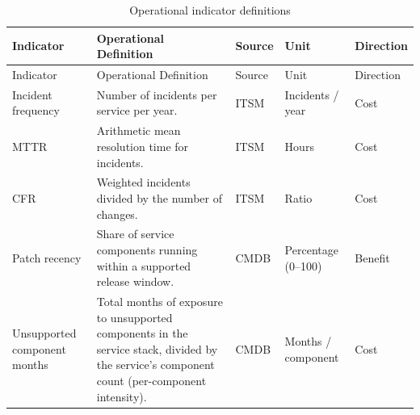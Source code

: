\documentclass[
  12pt,
  letterpaper,
  12pt,
  oneside,
  english,
  onehalfspacing,
  headsepline]{MastersDoctoralThesis}
\begin{document}
\begin{samepage}
\scriptsize

\begin{longtable}[]{@{}
  >{\raggedright\arraybackslash}p{}
  >{\raggedright\arraybackslash}p{}
  >{\raggedright\arraybackslash}p{}
  >{\raggedright\arraybackslash}p{}
  >{\raggedright\arraybackslash}p{}@{}}
\caption{Operational indicator
definitions}\label{tbl-indicators-def}\tabularnewline
\toprule\noalign{}
\begin{minipage}[b]{\linewidth}\raggedright
Indicator
\end{minipage} & \begin{minipage}[b]{\linewidth}\raggedright
Operational Definition
\end{minipage} & \begin{minipage}[b]{\linewidth}\raggedright
Source
\end{minipage} & \begin{minipage}[b]{\linewidth}\raggedright
Unit
\end{minipage} & \begin{minipage}[b]{\linewidth}\raggedright
Direction
\end{minipage} \\
\midrule\noalign{}
\endfirsthead
\toprule\noalign{}
\begin{minipage}[b]{\linewidth}\raggedright
Indicator
\end{minipage} & \begin{minipage}[b]{\linewidth}\raggedright
Operational Definition
\end{minipage} & \begin{minipage}[b]{\linewidth}\raggedright
Source
\end{minipage} & \begin{minipage}[b]{\linewidth}\raggedright
Unit
\end{minipage} & \begin{minipage}[b]{\linewidth}\raggedright
Direction
\end{minipage} \\
\midrule\noalign{}
\endhead
\bottomrule\noalign{}
\endlastfoot
Incident frequency & Number of incidents per service per year. & ITSM &
Incidents / year & Cost \\
MTTR & Arithmetic mean resolution time for incidents. & ITSM & Hours &
Cost \\
CFR & Weighted incidents divided by the number of changes. & ITSM &
Ratio & Cost \\
Patch recency & Share of service components running within a supported
release window. & CMDB & Percentage (0--100) & Benefit \\
Unsupported component months & Total months of exposure to unsupported
components in the service stack, divided by the service's component
count (per-component intensity). & CMDB & Months / component & Cost \\
\end{longtable}

\end{samepage}
\end{document}
